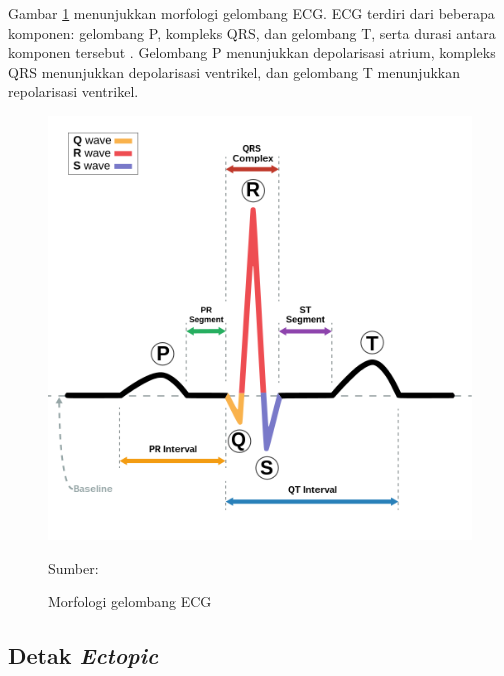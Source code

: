 Gambar \ref{fig: ecg-morphology} menunjukkan morfologi gelombang ECG. ECG terdiri dari beberapa komponen: gelombang P, kompleks QRS, dan gelombang T, serta durasi antara komponen tersebut \parencite{anbalaganAnalysisVariousTechniques2023}.  Gelombang P menunjukkan depolarisasi atrium, kompleks QRS menunjukkan depolarisasi ventrikel, dan gelombang T menunjukkan repolarisasi ventrikel.

\begin{figure}[H]
  \centering
  \includegraphics[width=.5\linewidth]{img/ecg-morphology.png}
  \caption{Morfologi gelombang ECG}
  Sumber: \textcite{wiki:xxx}
  \label{fig: ecg-morphology}
\end{figure}

\subsection{Detak \textit{Ectopic}}
\label{subsec: landasan-ectopic}

%

